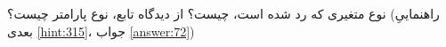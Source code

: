 \section{}
\paragraph{}\label{hint:145}
نوع متغیری که رد شده است، چیست؟ از دیدگاه تابع، نوع پارامتر چیست؟ (راهنماییِ بعدی \ref{hint:315}، جواب \ref{answer:72})